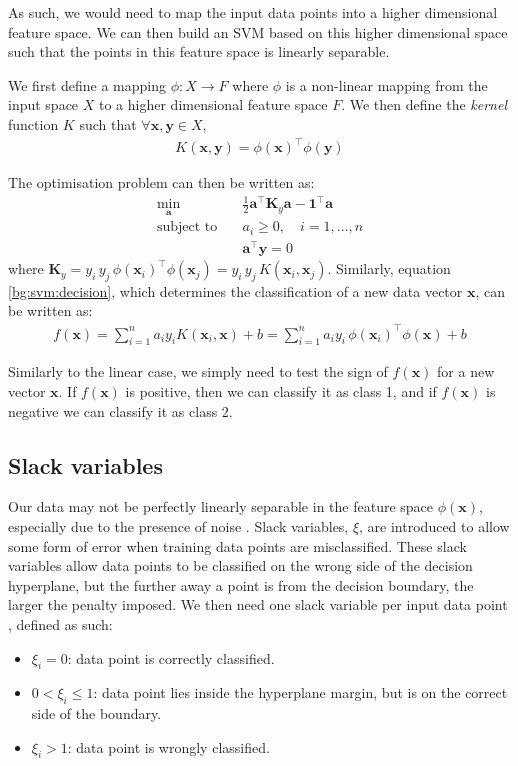 \documentclass[12pt, twoside, a4paper]{report}
\def\vec{\boldsymbol}
\begin{document}
As such, we would need to map the input data points into a higher dimensional feature space. We can then build an SVM based on this higher dimensional space such that the points in this feature space is linearly separable.

We first define a mapping $\phi : X \rightarrow F$ where $\phi$ is a non-linear mapping from the input space $X$ to a higher dimensional feature space $F$. We then define the \textit{kernel} function $K$ such that $\forall \vec x, \vec y \in X$,
\begin{align*}
K(\vec x, \vec y) = \phi(\vec x)^\top \phi(\vec{y})
\end{align*}

The optimisation problem can then be written as:
\begin{align*}
\min_{\vec a} \quad &\frac{1}{2} \vec{a}^\top \vec{K}_y \vec{a} - \vec{1}^\top \vec a \\
\text{subject to} \quad &a_i \geq 0, \quad i = 1, \dots , n \\
&\vec{a}^\top \vec y = 0
\end{align*}
where $\vec{K}_y = y_i \, y_j \, \phi(\vec{x}_i)^\top \phi(\vec{x}_j) = y_i \, y_j \, K(\vec{x}_i, \vec{x}_j)$. Similarly, equation \ref{bg:svm:decision}, which determines the classification of a new data vector $\vec{x}$, can be written as:
\begin{align*}
f(\vec{x}) = \sum_{i=1}^n a_i y_i K(\vec{x}_i, \vec{x}) + b = \sum_{i=1}^n a_i y_i \, \phi(\vec{x}_i)^\top \phi(\vec{x}) + b
\end{align*}

Similarly to the linear case, we simply need to test the sign of $f(\vec{x})$ for a new vector $\vec{x}$. If $f(\vec{x})$ is positive, then we can classify it as class 1, and if $f(\vec{x})$ is negative we can classify it as class 2.

\subsection{Slack variables}
Our data may not be perfectly linearly separable in the feature space $\phi(\vec{x})$, especially due to the presence of noise \cite{RefWorks:127}. Slack variables, $\xi$, are introduced to allow some form of error when training data points are misclassified. These slack variables allow data points to be classified on the wrong side of the decision hyperplane, but the further away a point is from the decision boundary, the larger the penalty imposed. We then need one slack variable per input data point \cite{RefWorks:126}, defined as such:
\begin{itemize}
\item $\xi_i = 0$: data point is correctly classified.
\item $0 < \xi_i \leq 1$: data point lies inside the hyperplane margin, but is on the correct side of the boundary.
\item $\xi_i > 1$: data point is wrongly classified.
\end{itemize}
\end{document}
